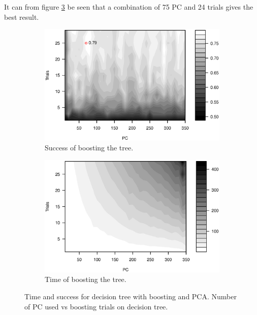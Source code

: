 It can from figure \ref{fig:tree_pca_boost} be seen that a combination of 75 PC and 24 trials gives the best result.

\begin{figure}[H]
\centering
    \begin{subfigure}[t]{0.49\textwidth}
        \includegraphics[width=\textwidth]{graphics/tree_pca_vs_boost_success}
        \caption{Success of boosting the tree.}
        \label{fig:tree_pca_boost_success}
    \end{subfigure}
    \begin{subfigure}[t]{0.49\textwidth}
        \includegraphics[width=\textwidth]{graphics/tree_pca_vs_boost_time}
        \caption{Time of boosting the tree.}
        \label{fig:tree_pca_boost_timing}
    \end{subfigure}
\caption[Time and success for decision tree with boosting and PCA.]{
Time and success for decision tree with boosting and PCA. Number of PC used vs boosting trials on decision tree.}
\label{fig:tree_pca_boost}
\end{figure}

